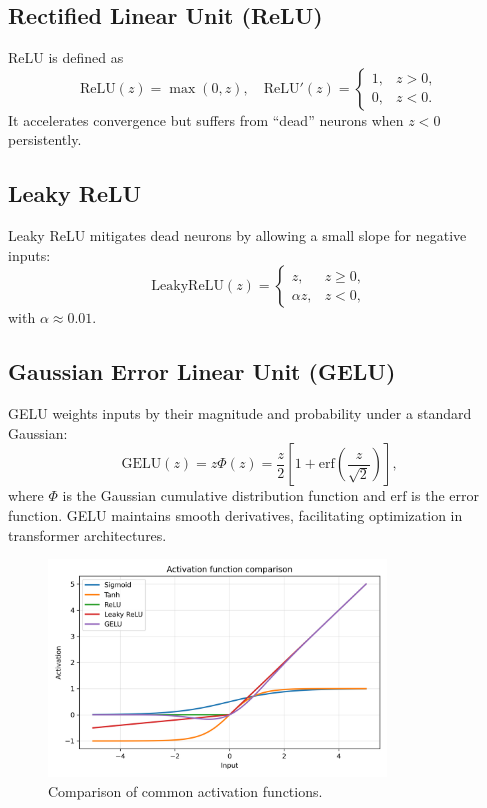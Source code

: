 ﻿\documentclass{article}
\begin{document}
\subsection{Rectified Linear Unit (ReLU)}
ReLU is defined as
\begin{equation}
  \mathrm{ReLU}(z) = \max(0, z), \quad \mathrm{ReLU}'(z) = \begin{cases}1,& z>0,\\0,& z<0.\end{cases}
\end{equation}
It accelerates convergence but suffers from ``dead'' neurons when $z<0$ persistently.

\subsection{Leaky ReLU}
Leaky ReLU mitigates dead neurons by allowing a small slope for negative inputs:
\begin{equation}
  \mathrm{LeakyReLU}(z) = \begin{cases} z,& z \ge 0,\\ \alpha z,& z < 0,\end{cases}
\end{equation}
with $\alpha \approx 0.01$.

\subsection{Gaussian Error Linear Unit (GELU)}
GELU weights inputs by their magnitude and probability under a standard Gaussian:
\begin{equation}
  \mathrm{GELU}(z) = z \Phi(z) = \frac{z}{2}\left[1 + \mathrm{erf}\left(\frac{z}{\sqrt{2}}\right)\right],
\end{equation}
where $\Phi$ is the Gaussian cumulative distribution function and $\mathrm{erf}$ is the error function. GELU maintains smooth derivatives, facilitating optimization in transformer architectures.

\begin{figure}[H]
  \centering
  \includegraphics[width=0.8\textwidth]{activation_functions.png}
  \caption{Comparison of common activation functions.}
  \label{fig:activation_functions}
\end{figure}
\FloatBarrier
\end{document}
